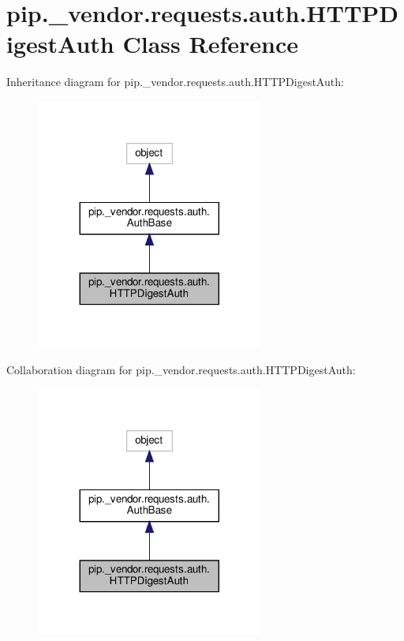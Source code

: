 \hypertarget{classpip_1_1__vendor_1_1requests_1_1auth_1_1HTTPDigestAuth}{}\section{pip.\+\_\+vendor.\+requests.\+auth.\+H\+T\+T\+P\+Digest\+Auth Class Reference}
\label{classpip_1_1__vendor_1_1requests_1_1auth_1_1HTTPDigestAuth}


Inheritance diagram for pip.\+\_\+vendor.\+requests.\+auth.\+H\+T\+T\+P\+Digest\+Auth\+:
\nopagebreak
\begin{figure}[H]
\begin{center}
\leavevmode
\includegraphics[width=212pt]{classpip_1_1__vendor_1_1requests_1_1auth_1_1HTTPDigestAuth__inherit__graph}
\end{center}
\end{figure}


Collaboration diagram for pip.\+\_\+vendor.\+requests.\+auth.\+H\+T\+T\+P\+Digest\+Auth\+:
\nopagebreak
\begin{figure}[H]
\begin{center}
\leavevmode
\includegraphics[width=212pt]{classpip_1_1__vendor_1_1requests_1_1auth_1_1HTTPDigestAuth__coll__graph}
\end{center}
\end{figure}
